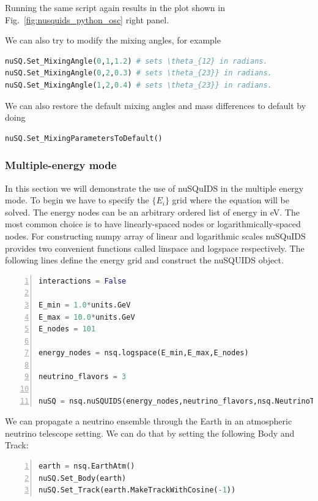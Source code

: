 \documentclass[3p,12pt]{elsarticle}
\newcommand{\ttf}{\ttfamily}
\begin{document}
Running the same script again results in the plot shown in Fig.~\ref{fig:nusquids_python_osc} right panel.

We can also try to modify the mixing angles, for example
\begin{lstlisting}[language=Python, breaklines=true]
nuSQ.Set_MixingAngle(0,1,1.2) # sets \theta_{12} in radians.
nuSQ.Set_MixingAngle(0,2,0.3) # sets \theta_{23}} in radians.
nuSQ.Set_MixingAngle(1,2,0.4) # sets \theta_{23}} in radians.
\end{lstlisting}
We can also restore the default mixing angles and mass differences to default by doing
\begin{lstlisting}[language=Python, breaklines=true]
nuSQ.Set_MixingParametersToDefault()
\end{lstlisting}

\subsubsection{Multiple-energy mode}

In this section we will demonstrate the use of {\ttf nuSQuIDS} in the multiple energy mode.
To begin we have to specify the $\{E_i\}$ grid where the equation will be solved.
The energy nodes can be an arbitrary ordered list of energy in eV.
The most common choice is to have linearly-spaced nodes or logarithmically-spaced nodes.
For constructing numpy array of linear and logarithmic scales nuSQuIDS provides two
 convenient functions called {\ttf linspace} and {\ttf logspace }respectively. The 
following lines define the energy grid and construct the nuSQUIDS object.

\begin{lstlisting}[language=Python, frame=leftline, numbers=left, breaklines=true]
interactions = False

E_min = 1.0*units.GeV
E_max = 10.0*units.GeV
E_nodes = 101

energy_nodes = nsq.logspace(E_min,E_max,E_nodes)

neutrino_flavors = 3

nuSQ = nsq.nuSQUIDS(energy_nodes,neutrino_flavors,nsq.NeutrinoType.neutrino,interactions)
\end{lstlisting}

We can propagate a neutrino ensemble through the Earth in an atmospheric neutrino telescope setting.
We can do that by setting the following Body and Track:

\begin{lstlisting}[language=Python, frame=leftline, numbers=left, breaklines=true]
earth = nsq.EarthAtm()
nuSQ.Set_Body(earth)
nuSQ.Set_Track(earth.MakeTrackWithCosine(-1))
\end{lstlisting}
\end{document}
